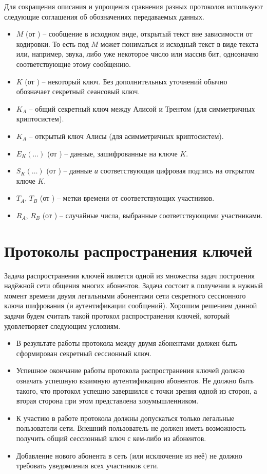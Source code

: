 Для сокращения описания и упрощения сравнения разных протоколов используют следующие соглашения об обозначениях передаваемых данных.

\begin{itemize}
	\item $M$ (от ) -- сообщение в исходном виде, открытый текст вне зависимости от кодировки. То есть под $M$ может пониматься и исходный текст в виде текста или, например, звука, либо уже некоторое число или массив бит, однозначно соответствующие этому сообщению.
	\item $K$ (от ) -- некоторый ключ. Без дополнительных уточнений обычно обозначает секретный сеансовый ключ.
	\item $K_A$ -- общий секретный ключ между Алисой и Трентом (для симметричных криптосистем).
	\item $K_A$ -- открытый ключ Алисы (для асимметричных криптосистем).
	\item $E_K \left( \dots \right)$ (от ) -- данные, зашифрованные на ключе $K$.
	\item $S_K \left( \dots \right)$ (от ) -- данные \emph{и} соответствующая цифровая подпись на открытом ключе $K$.
	\item $T_A$, $T_B$ (от ) -- метки времени от соответствующих участников.
	\item $R_A$, $R_B$ (от ) -- случайные числа, выбранные соответствующими участниками.
\end{itemize}



\section{Протоколы распространения ключей}

Задача распространения ключей является одной из множества задач построения надёжной сети общения многих абонентов. Задача состоит в получении в нужный момент времени двумя легальными абонентами сети секретного сессионного ключа шифрования (и аутентификации сообщений). Хорошим решением данной задачи будем считать такой протокол распространения ключей, который удовлетворяет следующим условиям.

\begin{itemize}
	\item В результате работы протокола между двумя абонентами должен быть сформирован секретный сессионный ключ.
	\item Успешное окончание работы протокола распространения ключей должно означать успешную взаимную аутентификацию абонентов. Не должно быть такого, что протокол успешно завершился с точки зрения одной из сторон, а вторая сторона при этом представлена злоумышленником.
	\item К участию в работе протокола должны допускаться только легальные пользователи сети. Внешний пользователь не должен иметь возможность получить общий сессионный ключ с кем-либо из абонентов.
	\item Добавление нового абонента в сеть (или исключение из неё) не должно требовать уведомления всех участников сети.
\end{itemize}

